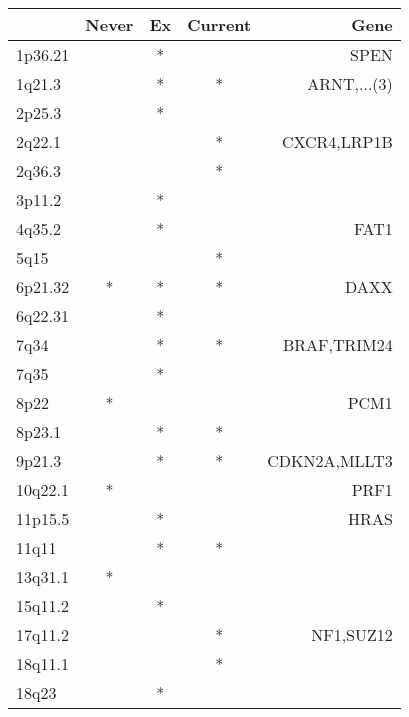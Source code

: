 \begin{tabular}{lcccr}
\toprule
{} & Never & Ex & Current &          Gene \\
\midrule
1p36.21 &       &  * &         &          SPEN \\
1q21.3  &       &  * &       * &   ARNT,...(3) \\
2p25.3  &       &  * &         &               \\
2q22.1  &       &    &       * &   CXCR4,LRP1B \\
2q36.3  &       &    &       * &               \\
3p11.2  &       &  * &         &               \\
4q35.2  &       &  * &         &          FAT1 \\
5q15    &       &    &       * &               \\
6p21.32 &     * &  * &       * &          DAXX \\
6q22.31 &       &  * &         &               \\
7q34    &       &  * &       * &   BRAF,TRIM24 \\
7q35    &       &  * &         &               \\
8p22    &     * &    &         &          PCM1 \\
8p23.1  &       &  * &       * &               \\
9p21.3  &       &  * &       * &  CDKN2A,MLLT3 \\
10q22.1 &     * &    &         &          PRF1 \\
11p15.5 &       &  * &         &          HRAS \\
11q11   &       &  * &       * &               \\
13q31.1 &     * &    &         &               \\
15q11.2 &       &  * &         &               \\
17q11.2 &       &    &       * &     NF1,SUZ12 \\
18q11.1 &       &    &       * &               \\
18q23   &       &  * &         &               \\
\bottomrule
\end{tabular}
